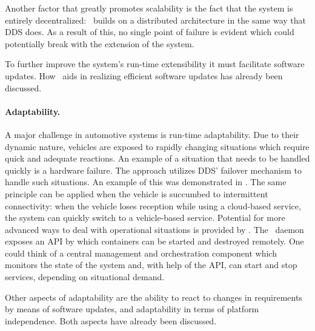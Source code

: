 Another factor that greatly promotes scalability is the fact that the system is entirely decentralized: \wnet\ builds on a distributed architecture in the same way that DDS does. As a result of this, no single point of failure is evident which could potentially break with the extension of the system.

To further improve the system's run-time extensibility it must facilitate software updates. How \docker\ aids in realizing efficient software updates has already been discussed.


\paragraph{Adaptability.}
A major challenge in automotive systems is run-time adaptability. Due to their dynamic nature, vehicles are exposed to rapidly changing situations which require quick and adequate reactions. An example of a situation that needs to be handled quickly is a hardware failure. The approach utilizes DDS' failover mechanism to handle such situations. An example of this was demonstrated in . The same principle can be applied when the vehicle is succumbed to intermittent connectivity: when the vehicle loses reception while using a cloud-based service, the system can quickly switch to a vehicle-based service. Potential for more advanced ways to deal with operational situations is provided by \docker . The \docker\ daemon exposes an API by which containers can be started and destroyed remotely. One could think of a central management and orchestration component which monitors the state of the system and, with help of the API, can start and stop services, depending on situational demand.

Other aspects of adaptability are the ability to react to changes in requirements by means of software updates, and adaptability in terms of platform independence. Both aspects have already been discussed.


